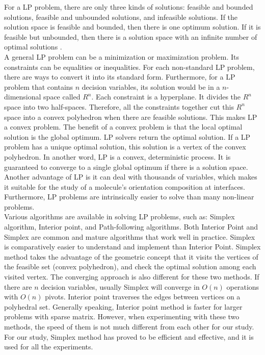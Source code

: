 For a LP problem, there are only three kinds of solutions: feasible and bounded solutions, feasible and unbounded solutions, and infeasible solutions. If the solution space is feasible and bounded, then there is one optimum solution. If it is feasible but unbounded, then there is a solution space with an infinite number of optimal solutions \cite{LP}. \\

A general LP problem can be a minimization or maximization problem. Its constraints can be equalities or inequalities. For each non-standard LP problem, there are ways to convert it into its standard form. Furthermore, for a LP problem that contains $n$ decision variables, its solution would be in a $n$-dimensional space called $R^{n}$. Each constraint is a hyperplane. It divides the $R^{n}$ space into two half-spaces. Therefore, all the constraints together cut this $R^{n}$ space into a convex polyhedron when there are feasible solutions. This makes LP a convex problem. The benefit of a convex problem is that the local optimal solution is the global optimum. LP solvers return the optimal solution. If a LP problem has a unique optimal solution, this solution is a vertex of the convex polyhedron. In another word, LP is a convex, deterministic process. It is guaranteed to converge to a single global optimum if there is a solution space. \\

Another advantage of LP is it can deal with thousands of variables, which makes it suitable for the study of a molecule's orientation composition at interfaces. Furthermore, LP problems are intrinsically easier to solve than many non-linear problems. \\

Various algorithms are available in solving LP problems, such as: Simplex algorithm, Interior point, and Path-following algorithms. Both Interior Point and Simplex are common and mature algorithms that work well in practice. Simplex is comparatively easier to understand and implement than Interior Point. Simplex method takes the advantage of the geometric concept that it visits the vertices of the feasible set (convex polyhedron), and check the optimal solution among each visited vertex. The converging approach is also different for these two methods. If there are $n$ decision variables, usually Simplex will converge in $O(n)$ operations with $O(n)$ pivots. Interior point traverses the edges between vertices on a polyhedral set. Generally speaking, Interior point method is faster for larger problems with sparse matrix. However, when experimenting with these two methods, the speed of them is not much different from each other for our study. For our study, Simplex method has proved to be efficient and effective, and it is used for all the experiments. \\

